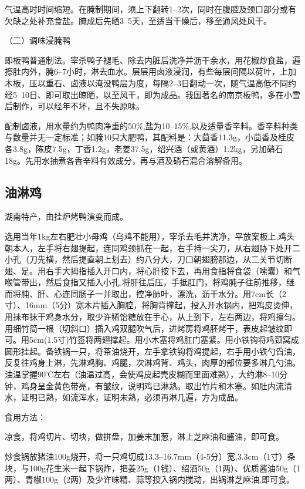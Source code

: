 \documentclass{ctexbook}
\begin{document}
气温高时时间缩短。在腌制期间，须上下翻转1--2次，同时在腹腔及颈口部分或有欠缺之处补充食盐。腌成后先晒3--5天，至适当干燥后，移至通风处风干。

（二）调味浸腌鸭

即板鸭普通制法。宰杀鸭子褪毛、除去内脏后洗净并沥干余水，用花椒炒食盐，遍擦肚内外，腌6--7小时，淋去血水。层层用卤液浸润，有些每层间隔以荷叶，上加木板，压以重石、卤液以淹没鸭层为度，每隔2--3日翻动一次，随气温高低不同约经5--10日、即可取出晾晒，以至风干，即为成品。我国著名的南京板鸭，多在小雪后制作，可以经年不坏，且不失原味。

配制卤液，用水量约为鸭肉净重的50\%,盐为10--15\%,以及适量香辛料。香辛料种类与数量并无一定标准；如腌10只大肥鸭，其配料是：大茴香11.3g，小茴香及桂皮各3.8g，陈皮7.5g，丁香1.2g，老姜37.5g，绍兴酒（或黄酒）1.2kg，另加硝石18g。先用水抽煮各香辛料有效成分，再与酒及硝石混合溶解备用。
\subsection{油淋鸡}
湖南特产，由挂炉烤鸭演变而成。

选用当年1kg左右肥壮小母鸡（乌鸡不能用），宰杀去毛并洗净，平放案板上,鸡头朝本人，左手将右翅提起，连同鸡颈抓在一起，右手持一尖刀，从右翅胁下处开二小孔（刀先横，然后提直朝上划去）约八分大，刀口朝翅膀那边，从二关节切断翅、足。用右手大拇指插入开口内，将心肝按下去，再用食指将食袋（嗦囊）和气喉管带出，然后食指又插入小孔,将肝往后压，手抵肛门，将鸡肫子往前推移，继而将肫、肝、心连同肠子一并取出，控净肺叶，漂洗，沥干水分。用7cm长（2寸）、16mm（5分）宽木片插入胸腔，将胸背撑起，投入开水锅内，把鸡皮烫伸，用抹布抹干鸡身水分，取少许稀饴糖放在手心，从上到下，左右两边，将鸡擦匀。用细竹简一根（切斜口）插入鸡双腿吹气后，进烤房将鸡胚烤干，表皮起皱纹即可。用5cm(1.5寸)竹签将两翅撑起。用小木塞将鸡肛门塞紧。用小铁钩将鸡颈窝成圆形挂起。备铁锅一只，将茶油烧开，左手拿铁钩将鸡提起，右手用小铁勺舀油，反复往鸡身上淋，先淋鸡胸、鸡腿，次淋鸡背、鸡头，肉厚的部位要多淋几勺油。油温掌握90℃左右（油温过高，会使鸡皮起壳皮糊而里面难熟），大约淋8--10分钟，鸡身呈金黄色带亮，有皱纹，说明鸡已淋熟。取出竹片和木塞。如肚内流清水，证明已熟，如流浑水，证明未熟，必须再淋几遍，方为成品。

食用方法：

凉食，将鸡切片、切块，做拼盘，加姜末加葱，淋上芝麻油和酱油，即可食。

炒食锅放猪油100g烧开，将一只鸡切成13.3--16.7mm（4-5分）宽,3.3cm（1寸）条块，与100g花生米一起下锅炸，把姜25g（1钱）、绍酒50g（1两）、优质酱油50g（1两）、青椒100g（2两）及少许味精、蒜等投入锅内搅动，出锅淋芝麻油,即可食。
\end{document}
